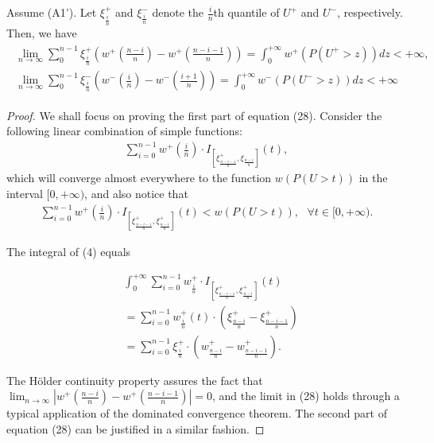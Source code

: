 \begin{proposition}
\label{prop:holder-quantile}
Assume (A1'). Let $\xi^+_{\frac{i}{n}}$ and $\xi^-_{\frac{i}{n}}$ denote the $\frac{i}{n}$th quantile of $U^+$ and $U^-$, respectively. Then, we have 
\begin{align}
\label{eq:simple-estimation}
\begin{split}
\lim_{n \rightarrow \infty} \sum_0^{n-1} \xi^+_{\frac{i}{n}} (w^+(\frac{n-i}{n})- w^+(\frac{n-i-1}{n}) ) = \int_0^{+\infty} w^+(P(U^+>z)) dz < +\infty,
\\
\lim_{n \rightarrow \infty} \sum_0^{n-1} \xi^-_{\frac{i}{n}} (w^-(\frac{i}{n})- w^-(\frac{i+1}{n}) ) = \int_0^{+\infty} w^-(P(U^->z)) dz < +\infty
\end{split}
\end{align}
\end{proposition}


\begin{proof}
We shall focus on proving the first part of equation (28). Consider the following linear combination of simple functions: 
\begin{align}
\sum_{i=0}^{n-1} w^+ (\frac{i}{n}) 
\cdot I_{[\xi^+_\frac{n-i-1}{n}, \xi_\frac{n-i}{n}]}(t),
\end{align}
which will converge almost everywhere to the function $w(P(U>t))$ in the interval $[0, +\infty)$, and also notice that 
\begin{align}
\sum_{i=0}^{n-1} w^+ (\frac{i}{n}) 
\cdot I_{[\xi^+_\frac{n-i-1}{n}, \xi^+_\frac{n-i}{n}]}(t)
<
w(P(U>t)),
\text{         } \forall t \in [0,+\infty).
\end{align}

The integral of (4) equals  

\begin{align}
& \int_0^{+\infty} \sum_{i=0}^{n-1} w^+_{\frac{i}{n}} \cdot I_{[\xi^+_\frac{n-i-1}{n},
\xi^+_\frac{n-i}{n}]}(t) \\ & = \sum_{i=0}^{n-1} w^+_{\frac{i}{n}}(t) \cdot (\xi^+_{\frac{n-i}{n}} -
\xi^+_{\frac{n-i-1}{n}}) \\ & = \sum_{i=0}^{n-1} \xi^+_{\frac{i}{n}} \cdot (w^+_{\frac{n-i}{n}}-
    w^+_{\frac{n-i-1}{n}}).
\end{align}

The H\"{o}lder continuity property assures the fact that 
$\lim_{n \rightarrow \infty}  | w^+(\frac{n-i}{n})- w^+(\frac{n-i-1}{n})| =0$, and the limit in (28) holds through a typical application of the dominated convergence theorem.
The second part of equation (28) can be justified in a similar fashion.
\end{proof} 

